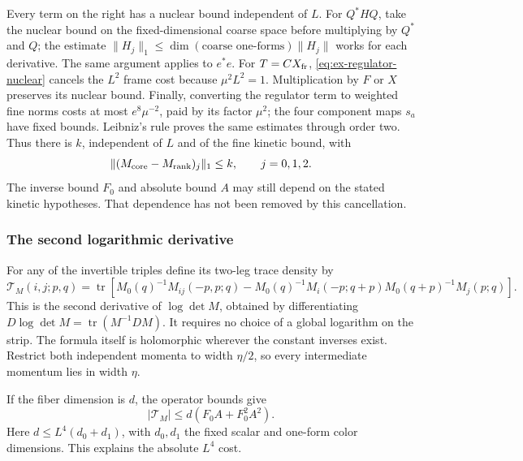 Every term on the right has a nuclear bound independent of $L$.
For $Q^*HQ$, take the nuclear bound on the fixed-dimensional
coarse space before multiplying by $Q^*$ and $Q$; the estimate
$\|H_j\|_1\leq\dim(\text{coarse one-forms})\|H_j\|$ works
for each derivative. The same argument applies to $e^*e$.
For $T=CX_{\rm fr}$, \eqref{eq:ex-regulator-nuclear} cancels
the $L^2$ frame cost because $\mu^2L^2=1$. Multiplication by
$F$ or $X$ preserves its nuclear bound. Finally, converting the
regulator term to weighted fine norms costs at most
$e^8\mu^{-2}$, paid by its factor $\mu^2$; the four component
maps $s_a$ have fixed bounds. Leibniz's rule proves the same
estimates through order two. Thus there is $k$, independent of
$L$ and of the fine kinetic bound, with
\begin{equation}\label{eq:ex-core-rank-nuclear}
 \|(M_{\rm core}-M_{\rm rank})_j\|_1\leq k,
                         \qquad j=0,1,2.
\end{equation}
The inverse bound $F_0$ and absolute bound $A$ may still depend
on the stated kinetic hypotheses. That dependence has not been
removed by this cancellation.

\subsubsection{The second logarithmic derivative}
For any of the invertible triples define its two-leg trace density by
\[
 \mathcal T_M(i,j;p,q)=\operatorname{tr}\left[
 M_0(q)^{-1}M_{ij}(-p,p;q)
 -M_0(q)^{-1}M_i(-p;q+p)M_0(q+p)^{-1}M_j(p;q)\right].
\]
This is the second derivative of $\log\det M$, obtained by
differentiating $D\log\det M=\operatorname{tr}(M^{-1}DM)$.
It requires no choice of a global logarithm on the strip. The
formula itself is holomorphic wherever the constant inverses exist.
Restrict both independent momenta to width $\eta/2$, so every
intermediate momentum lies in width $\eta$.

If the fiber dimension is $d$, the operator bounds give
\begin{equation}\label{eq:ex-absolute-trace-density}
 |\mathcal T_M|\leq d(F_0A+F_0^2A^2).
\end{equation}
Here $d\leq L^4(d_0+d_1)$, with $d_0,d_1$ the fixed scalar
and one-form color dimensions. This explains the absolute $L^4$
cost.

